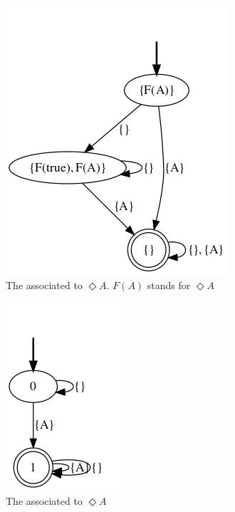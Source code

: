 \begin{example}
	\begin{figure}[h!]
		\centering
		\includegraphics[width=.4\linewidth]{images/ltlf-eventuallyA-nfa}
		\caption{The \NFA associated to $\Diamond A$. $F(A)$ stands for $\Diamond A$}\label{fig:nfa-eventually-a}
	\end{figure}
	\begin{figure}[h!]
		\centering
		\includegraphics[width=.3\linewidth]{images/ltlf-eventuallyA-dfa}
		\caption{The \DFA associated to $\Diamond A$}\label{fig:dfa-eventually-a}
	\end{figure}
	
\end{example}

